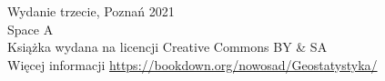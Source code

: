 \thispagestyle{empty}


\let\maketitle\oldmaketitle
\maketitle

\thispagestyle{empty}
\vspace*{\fill}
Wydanie trzecie, Poznań 2021 \\
Space A \\
Książka wydana na licencji Creative Commons BY \& SA \\
Więcej informacji \url{https://bookdown.org/nowosad/Geostatystyka/} \\
\\
\\


